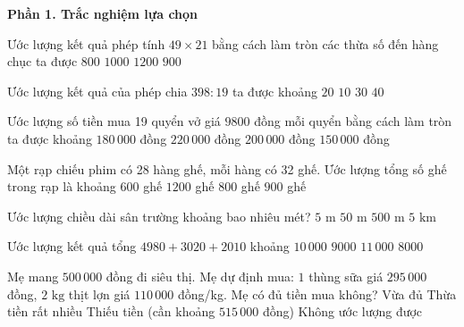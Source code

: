\textbf{Phần 1. Trắc nghiệm lựa chọn}

\begin{ex} %
Ước lượng kết quả phép tính $49 \times 21$ bằng cách làm tròn các thừa số đến hàng chục ta được
\choice
{$800$}
{\True $1000$}
{$1200$}
{$900$}
\end{ex}

\begin{ex} %
Ước lượng kết quả của phép chia $398 : 19$ ta được khoảng
\choice
{\True $20$}
{$10$}
{$30$}
{$40$}
\end{ex}

\begin{ex} %
Ước lượng số tiền mua 19 quyển vở giá $9800$ đồng mỗi quyển bằng cách làm tròn ta được khoảng
\choice
{$180\,000$ đồng}
{$220\,000$ đồng}
{\True $200\,000$ đồng}
{$150\,000$ đồng}
\end{ex}

\begin{ex} %
Một rạp chiếu phim có 28 hàng ghế, mỗi hàng có 32 ghế. Ước lượng tổng số ghế trong rạp là khoảng
\choice
{$600$ ghế}
{$1200$ ghế}
{$800$ ghế}
{\True $900$ ghế}
\end{ex}

\begin{ex} %
Ước lượng chiều dài sân trường khoảng bao nhiêu mét?
\choice
{$5\text{ m}$}
{\True $50\text{ m}$}
{$500\text{ m}$}
{$5\text{ km}$}
\end{ex}

\begin{ex} %
Ước lượng kết quả tổng $4980 + 3020 + 2010$ khoảng
\choice
{\True $10\,000$}
{$9000$}
{$11\,000$}
{$8000$}
\end{ex}

\begin{ex} %
Mẹ mang $500\,000$ đồng đi siêu thị. Mẹ dự định mua: $1$ thùng sữa giá $295\,000$ đồng, $2\text{ kg}$ thịt lợn giá $110\,000$ đồng/kg. Mẹ có đủ tiền mua không?
\choice
{Vừa đủ}
{Thừa tiền rất nhiều}
{\True Thiếu tiền (cần khoảng $515\,000$ đồng)}
{Không ước lượng được}
\end{ex}

